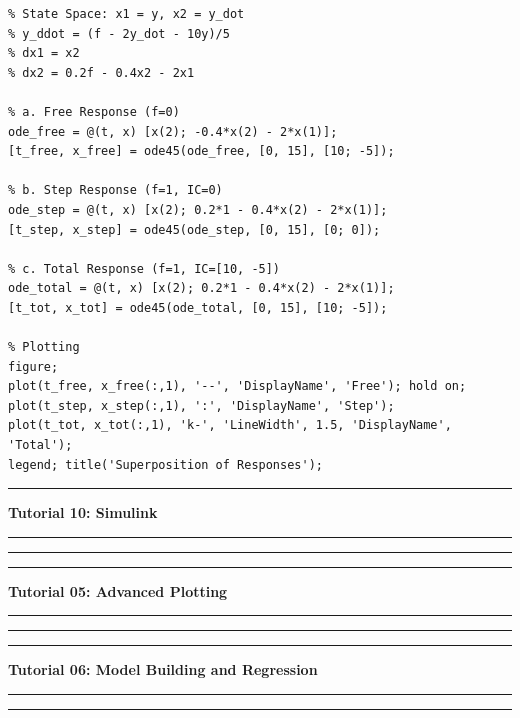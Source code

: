 \documentclass[DIN, pagenumber=false, fontsize=11pt, parskip=half]{scrartcl}
\newcommand{\mypart}[1]{\vspace{1cm}\hrule\vspace{0.5cm}\noindent\textbf{\LARGE #1}\vspace{0.5cm}\hrule\vspace{1cm}}
\begin{document}
\begin{lstlisting}
% State Space: x1 = y, x2 = y_dot
% y_ddot = (f - 2y_dot - 10y)/5
% dx1 = x2
% dx2 = 0.2f - 0.4x2 - 2x1

% a. Free Response (f=0)
ode_free = @(t, x) [x(2); -0.4*x(2) - 2*x(1)];
[t_free, x_free] = ode45(ode_free, [0, 15], [10; -5]);

% b. Step Response (f=1, IC=0)
ode_step = @(t, x) [x(2); 0.2*1 - 0.4*x(2) - 2*x(1)];
[t_step, x_step] = ode45(ode_step, [0, 15], [0; 0]);

% c. Total Response (f=1, IC=[10, -5])
ode_total = @(t, x) [x(2); 0.2*1 - 0.4*x(2) - 2*x(1)];
[t_tot, x_tot] = ode45(ode_total, [0, 15], [10; -5]);

% Plotting
figure;
plot(t_free, x_free(:,1), '--', 'DisplayName', 'Free'); hold on;
plot(t_step, x_step(:,1), ':', 'DisplayName', 'Step');
plot(t_tot, x_tot(:,1), 'k-', 'LineWidth', 1.5, 'DisplayName', 'Total');
legend; title('Superposition of Responses');
\end{lstlisting}

\newpage
\label{tut10}
\mypart{Tutorial 10: Simulink}



\vspace{1cm}
\hrule
\vspace{0.5cm}

\newpage
\label{tut5}
\mypart{Tutorial 05: Advanced Plotting}



\vspace{1cm}
\hrule
\vspace{0.5cm}

\newpage
\label{tut6}
\mypart{Tutorial 06: Model Building and Regression}



\vspace{1cm}
\hrule
\vspace{0.5cm}
\end{document}
